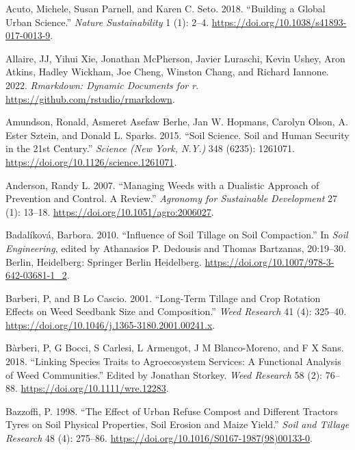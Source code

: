 \documentclass[
  12pt,
]{article}
\newlength{\cslhangindent}
\newlength{\cslentryspacingunit} %
\newenvironment{CSLReferences}[2] %
 {%
  \setlength{\parindent}{0pt}
  \ifodd #1
  \let\oldpar\par
  \def\par{\hangindent=\cslhangindent\oldpar}
  \fi
  \setlength{\parskip}{#2\cslentryspacingunit}
 }%
 {}
\begin{document}
\hypertarget{refs}{}
\begin{CSLReferences}{1}{0}
\leavevmode{}%
Acuto, Michele, Susan Parnell, and Karen C. Seto. 2018. {``Building a Global Urban Science.''} \emph{Nature Sustainability} 1 (1): 2--4. \url{https://doi.org/10.1038/s41893-017-0013-9}.

\leavevmode{}%
Allaire, JJ, Yihui Xie, Jonathan McPherson, Javier Luraschi, Kevin Ushey, Aron Atkins, Hadley Wickham, Joe Cheng, Winston Chang, and Richard Iannone. 2022. \emph{Rmarkdown: Dynamic Documents for r}. \url{https://github.com/rstudio/rmarkdown}.

\leavevmode{}%
Amundson, Ronald, Asmeret Asefaw Berhe, Jan W. Hopmans, Carolyn Olson, A. Ester Sztein, and Donald L. Sparks. 2015. {``Soil Science. {Soil} and Human Security in the 21st Century.''} \emph{Science (New York, N.Y.)} 348 (6235): 1261071. \url{https://doi.org/10.1126/science.1261071}.

\leavevmode{}%
Anderson, Randy L. 2007. {``Managing Weeds with a Dualistic Approach of Prevention and Control. {A} Review.''} \emph{Agronomy for Sustainable Development} 27 (1): 13--18. \url{https://doi.org/10.1051/agro:2006027}.

\leavevmode{}%
Badalíková, Barbora. 2010. {``Influence of {Soil Tillage} on {Soil Compaction}.''} In \emph{Soil {Engineering}}, edited by Athanasios P. Dedousis and Thomas Bartzanas, 20:19--30. {Berlin, Heidelberg}: {Springer Berlin Heidelberg}. \url{https://doi.org/10.1007/978-3-642-03681-1_2}.

\leavevmode{}%
Barberi, P, and B Lo Cascio. 2001. {``Long-Term Tillage and Crop Rotation Effects on Weed Seedbank Size and Composition.''} \emph{Weed Research} 41 (4): 325--40. \url{https://doi.org/10.1046/j.1365-3180.2001.00241.x}.

\leavevmode{}%
Bàrberi, P, G Bocci, S Carlesi, L Armengot, J M Blanco-Moreno, and F X Sans. 2018. {``Linking Species Traits to Agroecosystem Services: A Functional Analysis of Weed Communities.''} Edited by Jonathan Storkey. \emph{Weed Research} 58 (2): 76--88. \url{https://doi.org/10.1111/wre.12283}.

\leavevmode{}%
Bazzoffi, P. 1998. {``The Effect of Urban Refuse Compost and Different Tractors Tyres on Soil Physical Properties, Soil Erosion and Maize Yield.''} \emph{Soil and Tillage Research} 48 (4): 275--86. \url{https://doi.org/10.1016/S0167-1987(98)00133-0}.


\end{CSLReferences}
\end{document}
